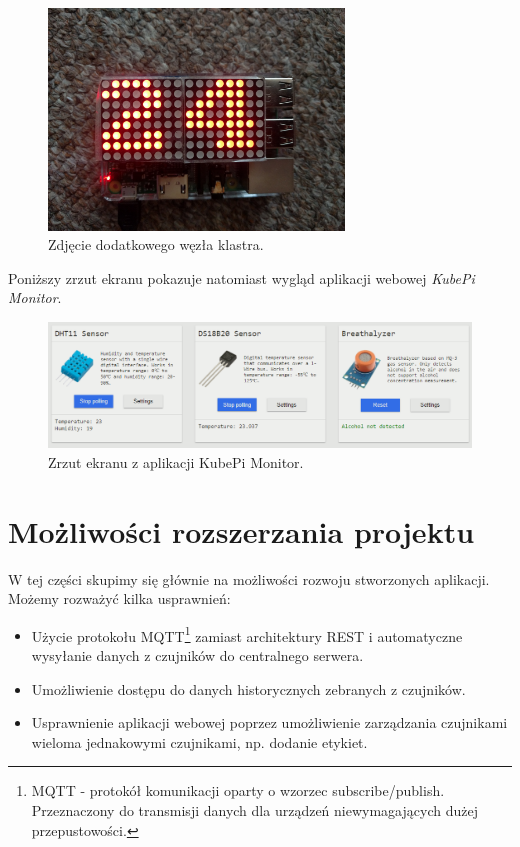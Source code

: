 \documentclass[12pt]{report}
\let\Oldsection\section
\renewcommand{\section}{\FloatBarrier\Oldsection}
\begin{document}
{\clearpage
\begin{figure}[h]
	\centering
	\includegraphics[angle=90,width=0.7\textwidth]{images/node.jpg}
	\caption{Zdjęcie dodatkowego węzła klastra.}
	\label{fig:led}
\end{figure}

\noindent Poniższy zrzut ekranu pokazuje natomiast wygląd aplikacji webowej \textit{KubePi Monitor}.
\begin{figure}[h]
	\centering
	\includegraphics[width=1\textwidth]{images/kubepi-monitor.png}
	\caption{Zrzut ekranu z aplikacji KubePi Monitor.}
\end{figure}

\section{Możliwości rozszerzania projektu}
W tej części skupimy się głównie na możliwości rozwoju stworzonych aplikacji. Możemy rozważyć kilka usprawnień:

\begin{itemize}
\item{Użycie protokołu MQTT\footnote{MQTT - protokół komunikacji oparty o wzorzec subscribe/publish. Przeznaczony do transmisji danych dla urządzeń niewymagających dużej przepustowości.} zamiast architektury REST i automatyczne wysyłanie danych z czujników do centralnego serwera.}
\item{Umożliwienie dostępu do danych historycznych zebranych z czujników.}
\item{Usprawnienie aplikacji webowej poprzez umożliwienie zarządzania czujnikami wieloma jednakowymi czujnikami, np. dodanie etykiet.}
\end{itemize}
}
\end{document}
